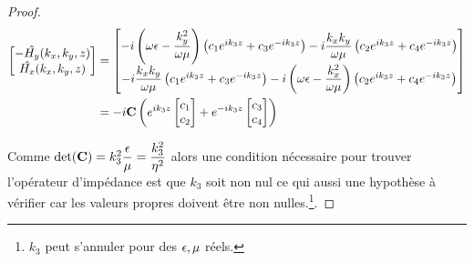 \begin{proof}
        \begin{align}
            \begin{bmatrix}
                -\hat{H_y}(k_x,k_y,z)\\
                \hat{H_x}(k_x,k_y,z)\\
            \end{bmatrix}
            &=
            \begin{bmatrix}
                -i\left(\omega\epsilon - \dfrac{k_y^2}{\omega\mu}\right) \left( c_1 e^{ik_3 z} + c_3 e^{-ik_3 z} \right) - i\dfrac{k_xk_y}{\omega\mu} \left( c_2 e^{ik_3 z} + c_4 e^{-ik_3 z} \right)
                \\
                -i\dfrac{k_xk_y}{\omega\mu} \left( c_1 e^{ik_3 z} + c_3 e^{-ik_3 z} \right) - i\left(\omega\epsilon - \dfrac{k_x^2}{\omega\mu}\right)\left( c_2 e^{ik_3 z} + c_4 e^{-ik_3 z} \right)
            \end{bmatrix} \\
            &=-i
            \mathbf{C}
            \left(
                e^{ik_3 z}
                \begin{bmatrix}
                    c_1 \\
                    c_2
                \end{bmatrix}
                +e^{-ik_3 z}
                \begin{bmatrix}
                    c_3 \\
                    c_4
                \end{bmatrix}
            \right)
        \end{align}

        Comme $\det(\mathbf{C}) = k_3^2\dfrac{\epsilon}{\mu}=\dfrac{k_3^2}{\eta^2}$ alors une condition nécessaire pour trouver l'opérateur d'impédance est que $k_3$ soit non nul ce qui aussi une hypothèse à vérifier car les valeurs propres doivent être non nulles.\footnote{$k_3$ peut s'annuler pour des $\epsilon,\mu$ réels.}.

    \end{proof}





